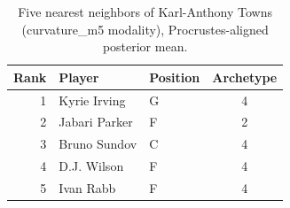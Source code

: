 \begin{table}[htbp]
  \centering\small
  \begin{tabular}{rllc}
    \toprule
    Rank & Player & Position & Archetype \\
    \midrule
    1 & Kyrie Irving & G & 4 \\
    2 & Jabari Parker & F & 2 \\
    3 & Bruno Sundov & C & 4 \\
    4 & D.J. Wilson & F & 4 \\
    5 & Ivan Rabb & F & 4 \\
    \bottomrule
  \end{tabular}
  \caption{Five nearest neighbors of Karl-Anthony Towns (curvature_m5 modality), Procrustes-aligned posterior mean.}
  \label{tab:Karl_Anthony_Towns_neighbors_curvature_m5}
\end{table}

